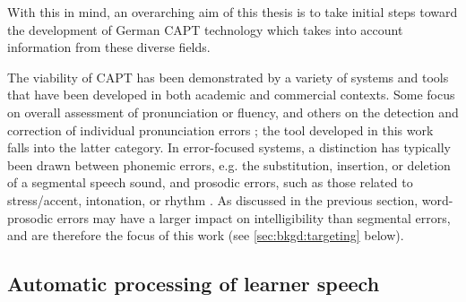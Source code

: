 With this in mind, an overarching aim of this thesis is to take initial steps toward the development of German CAPT technology which takes into account information from these diverse fields. 
%
%	
%
%
%	
%	
	\label{sec:capt:systems}
		
	The viability of CAPT has been demonstrated by a variety of systems and tools that have been developed in both academic and commercial contexts. Some focus on overall assessment of pronunciation or fluency, and others on the detection and correction of individual pronunciation errors \citep{Eskenazi2009}; the tool developed in this work falls into the latter category. In error-focused systems, a distinction has typically been drawn between phonemic errors, e.g. the substitution, insertion, or deletion of a segmental speech sound, and prosodic errors, such as those related to stress/accent, intonation, or rhythm \citep{Witt2012}. As discussed in the previous section, word-prosodic errors may have a larger impact on intelligibility than segmental errors, and are therefore the focus of this work (see \cref{sec:bkgd:targeting} below). 
	
	\subsection{Automatic processing of learner speech}
	
